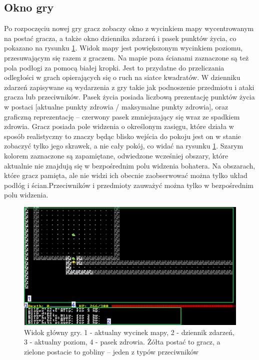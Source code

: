 \documentclass[12pt,twoside]{article}
\begin{document}
\subsection{Okno gry}
Po rozpoczęciu nowej gry gracz zobaczy okno z wycinkiem mapy wycentrowanym na postać gracza, a także okno dziennika zdarzeń i pasek punktów życia, co pokazano na rysunku \ref{mygame:game_window}. Widok mapy jest powiększonym wycinkiem poziomu, przesuwającym się razem z graczem. Na mapie poza ścianami zaznaczone są też pola podłogi za pomocą białej kropki. Jest to przydatne do przeliczania odległości w grach opierających się o ruch na siatce kwadratów. W dzienniku zdarzeń zapisywane są wydarzenia z gry takie jak podnoszenie przedmiotu i ataki gracza lub przeciwników. Pasek życia posiada liczbową prezentację punktów życia w postaci [aktualne punkty zdrowia / maksymalne punkty zdrowia], oraz graficzną reprezentację -- czerwony pasek zmniejszający się wraz ze spadkiem zdrowia. Gracz posiada pole widzenia o określonym zasięgu, które działa w sposób realistyczny to znaczy będąc blisko wejścia do pokoju jest on w stanie zobaczyć tylko jego skrawek, a nie cały pokój, co widać na rysunku \ref{mygame:game_window}. Szarym kolorem zaznaczone są zapamiętane, odwiedzone wcześniej obszary, które aktualnie nie znajdują się w bezpośrednim polu widzenia bohatera. Na obszarach, które gracz pamięta, ale nie widzi ich obecnie zaobserwować można tylko układ podłóg i ścian.Przeciwników i przedmioty zauważyć można tylko w bezpośrednim polu widzenia.

\FloatBarrier
\begin{figure}[ht]
	\centering
	\includegraphics[width=16cm]{images/mygame/game_window.png}
	\caption{Widok główny gry. 1 - aktualny wycinek mapy, 2 - dziennik zdarzeń, 3 - aktualny poziom, 4 - pasek zdrowia. Żółta postać to gracz, a zielone postacie to gobliny -- jeden z typów przeciwników }
	\label{mygame:game_window}
\end{figure}
\FloatBarrier
\end{document}
